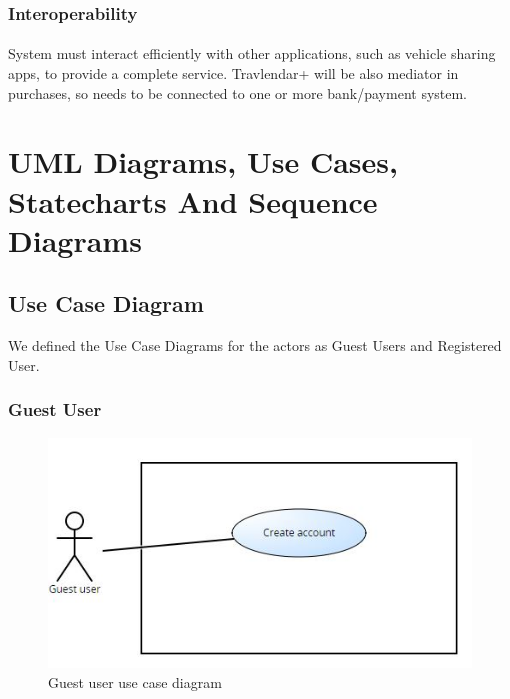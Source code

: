 \documentclass{article}
\begin{document}
\subsubsection{Interoperability}
\paragraph{}
System must interact efficiently with other applications, such as vehicle sharing apps, to provide a complete service. Travlendar+ will be also mediator in purchases, so needs to be connected to one or more bank/payment system.
\newpage
\section{UML Diagrams, Use Cases, Statecharts And Sequence Diagrams}
\subsection{Use Case Diagram}
We defined the Use Case Diagrams for the actors as Guest Users and Registered User.
\subsubsection{Guest User}
\begin{figure}[H]
\includegraphics[width=\linewidth]{Guestuserusecase.jpg}
\caption{Guest user use case diagram}
\label{fig:UCD1}
\end{figure}
\end{document}
